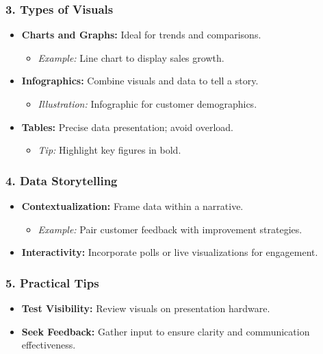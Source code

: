 \documentclass{beamer}
\begin{document}
\begin{frame}[fragile]
    \frametitle{3. Types of Visuals}
    \begin{itemize}
        \item \textbf{Charts and Graphs:} Ideal for trends and comparisons.
            \begin{itemize}
                \item \textit{Example:} Line chart to display sales growth.
            \end{itemize}
        \item \textbf{Infographics:} Combine visuals and data to tell a story.
            \begin{itemize}
                \item \textit{Illustration:} Infographic for customer demographics.
            \end{itemize}
        \item \textbf{Tables:} Precise data presentation; avoid overload.
            \begin{itemize}
                \item \textit{Tip:} Highlight key figures in bold.
            \end{itemize}
    \end{itemize}
\end{frame}

\begin{frame}[fragile]
    \frametitle{4. Data Storytelling}
    \begin{itemize}
        \item \textbf{Contextualization:} Frame data within a narrative.
            \begin{itemize}
                \item \textit{Example:} Pair customer feedback with improvement strategies.
            \end{itemize}
        \item \textbf{Interactivity:} Incorporate polls or live visualizations for engagement.
    \end{itemize}
\end{frame}

\begin{frame}[fragile]
    \frametitle{5. Practical Tips}
    \begin{itemize}
        \item \textbf{Test Visibility:} Review visuals on presentation hardware.
        \item \textbf{Seek Feedback:} Gather input to ensure clarity and communication effectiveness.
    \end{itemize}
\end{frame}
\end{document}
